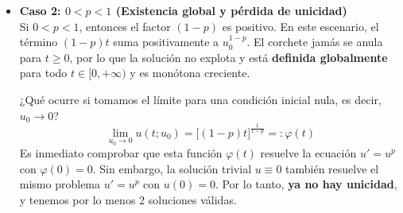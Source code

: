 \begin{itemize}
    \item \textbf{Caso 2: $0 < p < 1$ (Existencia global y pérdida de unicidad)} \\
    Si $0 < p < 1$, entonces el factor $(1-p)$ es positivo. En este escenario, el término $(1-p)t$ suma positivamente a $u_0^{1-p}$. El corchete jamás se anula para $t \ge 0$, por lo que la solución no explota y está \textbf{definida globalmente} para todo $t \in [0, +\infty)$ y es monótona creciente.
    
    ¿Qué ocurre si tomamos el límite para una condición inicial nula, es decir, $u_0 \to 0$?
    $$ \lim_{u_0 \to 0} u(t; u_0) = \Big[ (1-p)t \Big]^{\frac{1}{1-p}} =: \varphi(t) $$
    Es inmediato comprobar que esta función $\varphi(t)$ resuelve la ecuación $u' = u^p$ con $\varphi(0) = 0$. 
    Sin embargo, la solución trivial $u \equiv 0$ también resuelve el mismo problema $u' = u^p$ con $u(0) = 0$. 
    Por lo tanto, \textbf{ya no hay unicidad}, y tenemos por lo menos 2 soluciones válidas.

    \begin{center}
    \end{center}
\end{itemize}


